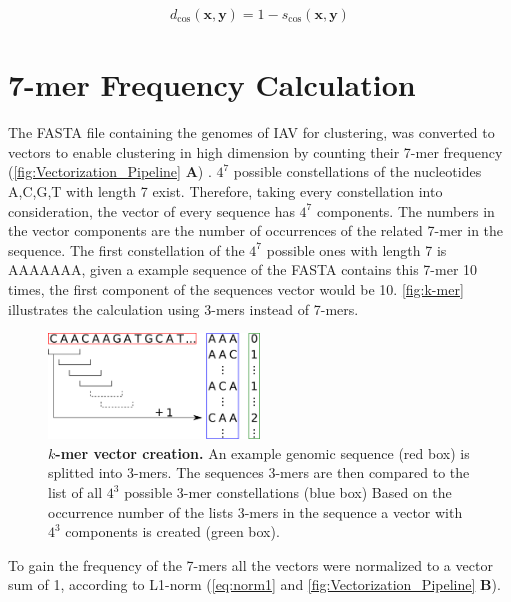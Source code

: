 \begin{equation}\label{eq:cos}
    \begin{aligned}
        d_{\text{cos}}(\mathbf{x}, \mathbf{y}) = 1 - s_{\text{cos}}(\mathbf{x}, \mathbf{y})
    \end{aligned}
\end{equation}

\section{7-mer Frequency Calculation} \label{sec:Frequency}

The FASTA file containing the genomes of \gls{IAV} for clustering, was converted to vectors to enable clustering in high dimension by counting their 7-mer frequency (\autoref{fig:Vectorization_Pipeline} \textsf{\textbf{A}}) \autocite{edgar_muscle_2004}. $4^7$ possible constellations of the nucleotides A,C,G,T with length 7 exist. Therefore, taking every constellation into consideration, the vector of every sequence has $4^7$ components. The numbers in the vector components are the number of occurrences of the related 7-mer in the sequence. The first constellation of the $4^7$ possible ones with length 7 is AAAAAAA, given a example sequence of the FASTA contains this 7-mer 10 times, the first component of the sequences vector would be 10. \autoref{fig:k-mer} illustrates the calculation using 3-mers instead of 7-mers.

\begin{figure}[!hbt]
    \centering
    \includegraphics[width=0.5\textwidth]{Graphics/Kmer.pdf}
    \caption[$k$-mer vector creation]{\textbf{$k$-mer vector creation.} An example genomic sequence (red box) is splitted into 3-mers. The sequences 3-mers are then compared to the list of all $4^3$ possible 3-mer constellations (blue box) Based on the occurrence number of the lists 3-mers in the sequence a vector with $4^3$ components is created (green box).}
    \label{fig:k-mer}
\end{figure}

To gain the frequency of the 7-mers all the vectors were normalized to a vector sum of 1, according to L1-norm (\autoref{eq:norm1} and \autoref{fig:Vectorization_Pipeline} \textsf{\textbf{B}}). 


